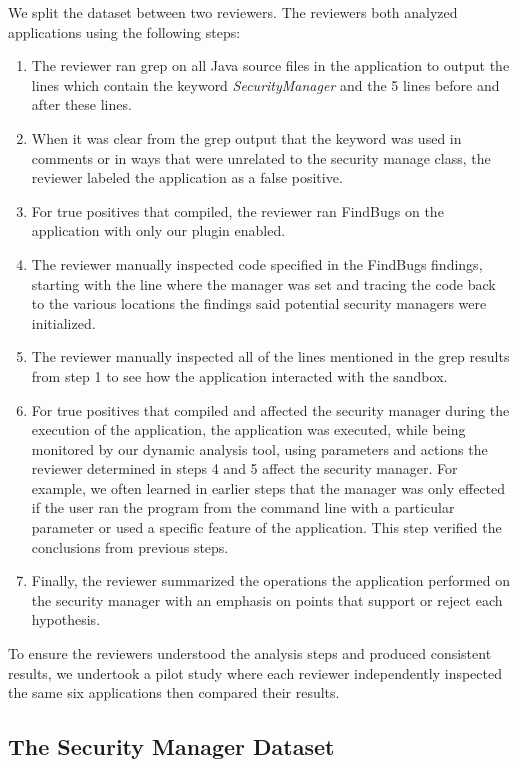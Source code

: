 \documentclass{sig-alternate}
\begin{document}
We split the dataset between two reviewers. The reviewers both analyzed
applications using the following steps:
\begin{enumerate}
\item The reviewer ran grep on all Java source files in the application
to output the lines which contain the keyword \textsl{SecurityManager}
and the 5 lines before and after these lines.
\item When it was clear from the grep output that the keyword was used in
comments or in ways that were unrelated to the security manage class,
the reviewer labeled the application as a false positive.
\item For true positives that compiled, the reviewer ran FindBugs on the
application with only our plugin enabled. 
\item The reviewer manually inspected code specified in the FindBugs findings,
starting with the line where the manager was set and tracing the code
back to the various locations the findings said potential security
managers were initialized. 
\item The reviewer manually inspected all of the lines mentioned in the
grep results from step 1 to see how the application interacted with
the sandbox. 
\item For true positives that compiled and affected the security manager
during the execution of the application, the application was executed,
while being monitored by our dynamic analysis tool, using parameters
and actions the reviewer determined in steps 4 and 5 affect the security
manager. For example, we often learned in earlier steps that the manager
was only effected if the user ran the program from the command line
with a particular parameter or used a specific feature of the application.
This step verified the conclusions from previous steps.
\item Finally, the reviewer summarized the operations the application performed
on the security manager with an emphasis on points that support or
reject each hypothesis.
\end{enumerate}
To ensure the reviewers understood the analysis steps and produced
consistent results, we undertook a pilot study where each reviewer
independently inspected the same six applications then compared their
results.


\subsection{The Security Manager Dataset}\label{sec:Applications-Studied}
\end{document}

